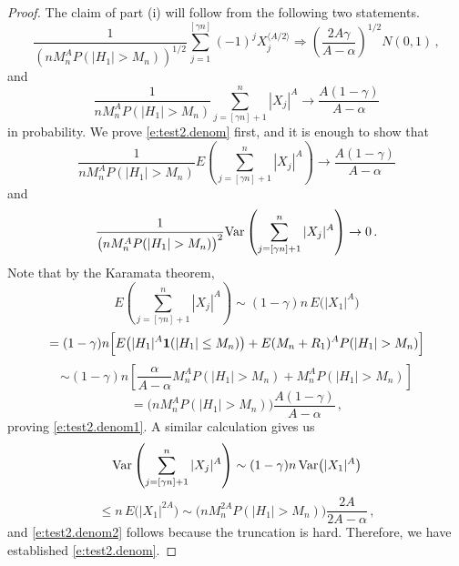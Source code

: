 \documentclass[11pt]{amsart}
\numberwithin{equation}{section}
\begin{document}
\begin{proof}
The claim of part (i) will follow from the following two statements.
\begin{equation} \label{e:test2.num}
\frac{1}{(nM_n^A P(|H_1|>M_n))^{1/2}}
\sum_{j=1}^{[\gamma
      n]}(-1)^jX_{j}^{\langle A/2\rangle} \Rightarrow \left(
      \frac{2A\gamma}{A-\alpha}\right)^{1/2} N(0,1)\,,
\end{equation}
and
\begin{equation} \label{e:test2.denom}
\frac{1}{nM_n^A P(|H_1|>M_n)} \sum_{j=[\gamma
      n]+1}^n|X_{j}|^A \to \frac{A(1-\gamma)}{A-\alpha}
\end{equation}
in probability. We prove \eqref{e:test2.denom} first, and it is enough
to show that
\begin{equation} \label{e:test2.denom1}
\frac{1}{nM_n^A P(|H_1|>M_n)}E\left( \sum_{j=[\gamma
      n]+1}^n|X_{j}|^A\right)\to \frac{A(1-\gamma)}{A-\alpha}
\end{equation}
and
\begin{equation} \label{e:test2.denom2}
\frac{1}{\bigl( nM_n^A P(|H_1|>M_n)\bigr)^2}
{\rm Var}\left( \sum_{j=[\gamma
      n]+1}^n|X_{j}|^A\right)\to 0\,.
\end{equation}
Note that by the Karamata theorem,
$$
E\left( \sum_{j=[\gamma n]+1}^n|X_{j}|^A\right)
\sim (1-\gamma)n\, E\bigl( |X_{1}|^A\bigr)
$$
$$
= (1-\gamma)n \Bigl[ E\bigl( |H_1|^A {{\bf 1}}(|H_1|\leq M_n)\bigr)
+ E(M_n+R_1)^A P(|H_1|> M_n)\Bigr]
$$
$$
\sim (1-\gamma)n \left[ \frac{\alpha}{A-\alpha}M_n^A P(|H_1|>M_n)
+ M_n^A P(|H_1|>M_n)\right]
$$
$$
= \bigl( nM_n^A P(|H_1|>M_n)\bigr)
\frac{A(1-\gamma)}{A-\alpha} \,,
$$
proving \eqref{e:test2.denom1}. A similar calculation gives us
$$
{\rm Var}\left( \sum_{j=[\gamma n]+1}^n|X_{j}|^A\right)
\sim (1-\gamma)n\, {\rm Var}\bigl( |X_{1}|^A\bigr)
$$
$$
\leq n\, E\bigl( |X_{1}|^{2A}\bigr)
\sim \bigl( nM_n^{2A} P(|H_1|>M_n)\bigr)\frac{2A}{2A-\alpha}\,,
$$
and \eqref{e:test2.denom2} follows because the truncation is
hard. Therefore, we have established \eqref{e:test2.denom}.


\end{proof}
\end{document}
